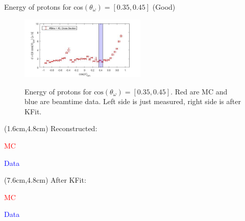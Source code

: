 \documentclass[
		10pt
		]{beamer}
\begin{document}
\begin{frame}{Energy of protons for cos$(\theta_{\omega})=[0.35,0.45]$ (Good)}
	
	\begin{figure}
		\hspace{0cm}  \vspace{-1cm}
		\includegraphics[width=6cm]{Plots/9}
	\end{figure}
	
	\begin{figure}%
		\centering
		\qquad
		\captionsetup{labelformat=empty}
		\caption{Energy of protons for $\textrm{cos}(\theta_{\omega}) = [0.35, 0.45] $. Red are MC and blue are beamtime data. Left side is just measured, right side is after KFit. }%
		\label{fig:example}%
	\end{figure}
	
	
	\begin{textblock*}{4.5cm}(1.6cm,4.8cm)
		\footnotesize Reconstructed:
		
		\footnotesize \textcolor{red}{MC}
		
		\footnotesize \textcolor{blue}{Data}
	\end{textblock*}
	
	\begin{textblock*}{4.5cm}(7.6cm,4.8cm)
		\footnotesize After KFit:
		
		\footnotesize \textcolor{red}{MC}
		
		\footnotesize \textcolor{blue}{Data}
	\end{textblock*}
	
	
	
\end{frame}
\end{document}
